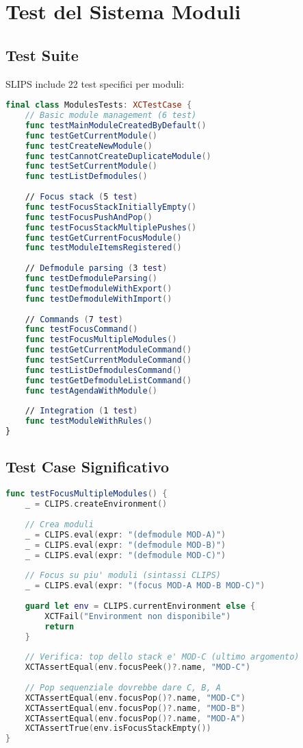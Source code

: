 \section{Test del Sistema Moduli}

\subsection{Test Suite}

SLIPS include 22 test specifici per moduli:

\begin{lstlisting}[language=Swift]
final class ModulesTests: XCTestCase {
    // Basic module management (6 test)
    func testMainModuleCreatedByDefault()
    func testGetCurrentModule()
    func testCreateNewModule()
    func testCannotCreateDuplicateModule()
    func testSetCurrentModule()
    func testListDefmodules()
    
    // Focus stack (5 test)
    func testFocusStackInitiallyEmpty()
    func testFocusPushAndPop()
    func testFocusStackMultiplePushes()
    func testGetCurrentFocusModule()
    func testModuleItemsRegistered()
    
    // Defmodule parsing (3 test)
    func testDefmoduleParsing()
    func testDefmoduleWithExport()
    func testDefmoduleWithImport()
    
    // Commands (7 test)
    func testFocusCommand()
    func testFocusMultipleModules()
    func testGetCurrentModuleCommand()
    func testSetCurrentModuleCommand()
    func testListDefmodulesCommand()
    func testGetDefmoduleListCommand()
    func testAgendaWithModule()
    
    // Integration (1 test)
    func testModuleWithRules()
}
\end{lstlisting}

\subsection{Test Case Significativo}

\begin{lstlisting}[language=Swift]
func testFocusMultipleModules() {
    _ = CLIPS.createEnvironment()
    
    // Crea moduli
    _ = CLIPS.eval(expr: "(defmodule MOD-A)")
    _ = CLIPS.eval(expr: "(defmodule MOD-B)")
    _ = CLIPS.eval(expr: "(defmodule MOD-C)")
    
    // Focus su piu' moduli (sintassi CLIPS)
    _ = CLIPS.eval(expr: "(focus MOD-A MOD-B MOD-C)")
    
    guard let env = CLIPS.currentEnvironment else {
        XCTFail("Environment non disponibile")
        return
    }
    
    // Verifica: top dello stack e' MOD-C (ultimo argomento)
    XCTAssertEqual(env.focusPeek()?.name, "MOD-C")
    
    // Pop sequenziale dovrebbe dare C, B, A
    XCTAssertEqual(env.focusPop()?.name, "MOD-C")
    XCTAssertEqual(env.focusPop()?.name, "MOD-B")
    XCTAssertEqual(env.focusPop()?.name, "MOD-A")
    XCTAssertTrue(env.isFocusStackEmpty())
}
\end{lstlisting}

